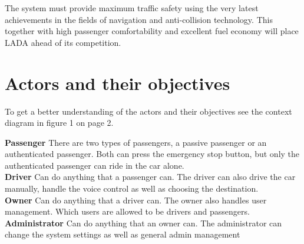\documentclass{article}
\begin{document}
The system must provide maximum traffic safety using the very latest achievements in the fields of navigation and anti-collision technology. This together with high passenger comfortability and excellent fuel economy will place LADA ahead of its competition.   




\section{Actors and their objectives}
To get a better understanding of the actors and their objectives see the context diagram in figure 1 on page 2.
\newline

\noindent
\textbf{Passenger} There are two types of passengers, a passive passenger or an authenticated passenger. Both can press the emergency stop button, but only the authenticated passenger can ride in the car alone.\\
\textbf{Driver} Can do anything that a passenger can.
The driver can also drive the car manually, handle the voice control as well as choosing the destination. \\
\textbf{Owner} Can do anything that a driver can. The owner also handles user management. Which users are allowed to be drivers and passengers. \\
\textbf{Administrator} Can do anything that an owner can.
The administrator can change the system settings as well as general admin management \\


\end{document}
